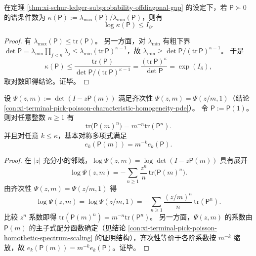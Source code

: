 \begin{auditcor}[条件数的熵上界]\label{cor:xi-schur-ledger-condition-number-entropy-bound}
在定理 \ref{thm:xi-schur-ledger-subprobability-offdiagonal-gap} 的设定下，若 \(\mathsf P\succ 0\) 的谱条件数为
\(
\kappa(\mathsf P):=\lambda_{\max}(\mathsf P)/\lambda_{\min}(\mathsf P)
\)，则有
\[
\log \kappa(\mathsf P)\le I_\partial.
\]
\end{auditcor}
\begin{proof}
有 \(\lambda_{\max}(\mathsf P)\le \mathrm{tr}(\mathsf P)\)。
另一方面，对 \(\lambda_{\min}\) 有粗下界
\(
\det\mathsf P=\lambda_{\min}\prod_{j<\kappa}\lambda_j\le \lambda_{\min}(\mathrm{tr}\,\mathsf P)^{\kappa-1}
\)，故 \(\lambda_{\min}\ge \det\mathsf P/(\mathrm{tr}\,\mathsf P)^{\kappa-1}\)。
于是
\[
\kappa(\mathsf P)\le \frac{\mathrm{tr}(\mathsf P)}{\det\mathsf P/(\mathrm{tr}\,\mathsf P)^{\kappa-1}}
=\frac{(\mathrm{tr}\,\mathsf P)^{\kappa}}{\det\mathsf P}
=\exp(I_\partial),
\]
取对数即得结论。证毕。
\end{proof}

\begin{auditthm}\label{thm:xi-schur-ledger-newton-sums-homogeneity}
设
\(
\Psi(z,m):=\det(I-z\mathsf P(m))
\)
满足齐次性 \(\Psi(z,m)=\Psi(z/m,1)\)（结论 \ref{con:xi-terminal-pick-poisson-characteristic-homogeneity-pde}）。
令 \(\mathsf P:=\mathsf P(1)\)。
则对任意整数 \(n\ge 1\) 有
\[
\mathrm{tr}\bigl(\mathsf P(m)^n\bigr)=m^{-n}\mathrm{tr}(\mathsf P^n).
\]
并且对任意 \(k\le \kappa\)，基本对称多项式满足
\[
e_k(\mathsf P(m))=m^{-k}e_k(\mathsf P).
\]
\end{auditthm}
\begin{proof}
在 \(|z|\) 充分小的邻域，\(\log\Psi(z,m)=\log\det(I-z\mathsf P(m))\) 具有展开
\[
\log\Psi(z,m)=-\sum_{n\ge 1}\frac{z^n}{n}\,\mathrm{tr}\bigl(\mathsf P(m)^n\bigr).
\]
由齐次性 \(\Psi(z,m)=\Psi(z/m,1)\) 得
\[
\log\Psi(z,m)=\log\Psi(z/m,1)=-\sum_{n\ge 1}\frac{(z/m)^n}{n}\,\mathrm{tr}(\mathsf P^n).
\]
比较 \(z^n\) 系数即得 \(\mathrm{tr}(\mathsf P(m)^n)=m^{-n}\mathrm{tr}(\mathsf P^n)\)。
另一方面，\(\Psi(z,m)\) 的系数由 \(\mathsf P(m)\) 的主子式配分函数确定（见结论 \ref{con:xi-terminal-pick-poisson-homothetic-spectrum-scaling} 的证明结构），齐次性等价于各阶系数按 \(m^{-k}\) 缩放，故 \(e_k(\mathsf P(m))=m^{-k}e_k(\mathsf P)\)。证毕。
\end{proof}

